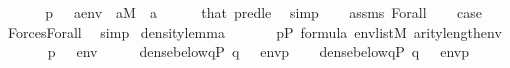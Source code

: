 \begin{isabellebody}
\ \ \isamarkupfalse%
\isanewline
\ \ \isamarkupfalse%
\ {\isachardoublequoteopen}p\ {\isasymtturnstile}\ {\isasymphi}\ {\isacharparenleft}{\kern0pt}{\isacharbrackleft}{\kern0pt}a{\isacharbrackright}{\kern0pt}{\isacharat}{\kern0pt}env{\isacharparenright}{\kern0pt}{\isachardoublequoteclose}\ \ {\isachardoublequoteopen}a{\isasymin}M{\isachardoublequoteclose}\ \ a\isanewline
\ \ \ \ \isamarkupfalse%
\ that\ pred{\isacharunderscore}{\kern0pt}le{}\ \isamarkupfalse%
\ simp\isanewline
\ \ \isamarkupfalse%
\ assms\ Forall\isanewline
\ \ \isamarkupfalse%
\ {\isacharquery}{\kern0pt}case\ \isamarkupfalse%
\ Forces{\isacharunderscore}{\kern0pt}Forall\ \isamarkupfalse%
\ simp\isanewline
{}\isamarkupfalse%
%
\endisatagproof
{\isafoldproof}%
%
\isadelimproof
\isanewline
%
\endisadelimproof
\isanewline
{}\isamarkupfalse%
\ density{\isacharunderscore}{\kern0pt}lemma{\isacharcolon}{\kern0pt}\isanewline
\ \ \isanewline
\ \ \ \ {\isachardoublequoteopen}p{\isasymin}P{\isachardoublequoteclose}\ {\isachardoublequoteopen}{\isasymphi}{\isasymin}formula{\isachardoublequoteclose}\ {\isachardoublequoteopen}env{\isasymin}list{\isacharparenleft}{\kern0pt}M{\isacharparenright}{\kern0pt}{\isachardoublequoteclose}\ {\isachardoublequoteopen}arity{\isacharparenleft}{\kern0pt}{\isasymphi}{\isacharparenright}{\kern0pt}{\isasymle}length{\isacharparenleft}{\kern0pt}env{\isacharparenright}{\kern0pt}{\isachardoublequoteclose}\isanewline
\ \ \isanewline
\ \ \ \ {\isachardoublequoteopen}p\ {\isasymtturnstile}\ {\isasymphi}\ env\ \ \ {\isasymlongleftrightarrow}\ \ \ dense{\isacharunderscore}{\kern0pt}below{\isacharparenleft}{\kern0pt}{\isacharbraceleft}{\kern0pt}q{\isasymin}P{\isachardot}{\kern0pt}\ {\isacharparenleft}{\kern0pt}q\ {\isasymtturnstile}\ {\isasymphi}\ env{\isacharparenright}{\kern0pt}{\isacharbraceright}{\kern0pt}{\isacharcomma}{\kern0pt}p{\isacharparenright}{\kern0pt}{\isachardoublequoteclose}\isanewline
%
\isadelimproof
%
\endisadelimproof
%
\isatagproof
{}\isamarkupfalse%
\isanewline
\ \ \isamarkupfalse%
\ {\isachardoublequoteopen}dense{\isacharunderscore}{\kern0pt}below{\isacharparenleft}{\kern0pt}{\isacharbraceleft}{\kern0pt}q{\isasymin}P{\isachardot}{\kern0pt}\ {\isacharparenleft}{\kern0pt}q\ {\isasymtturnstile}\ {\isasymphi}\ env{\isacharparenright}{\kern0pt}{\isacharbraceright}{\kern0pt}{\isacharcomma}{\kern0pt}p{\isacharparenright}{\kern0pt}{\isachardoublequoteclose}\isanewline

\end{isabellebody}
